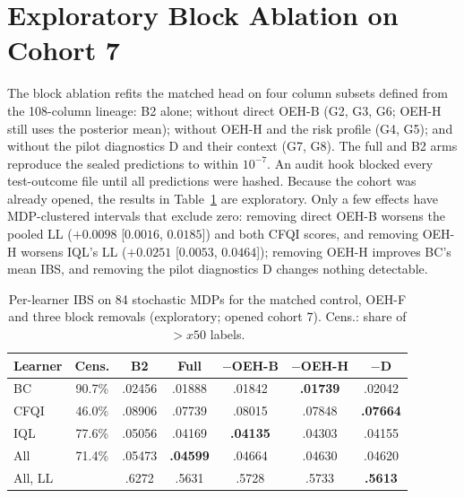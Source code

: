 \section{Exploratory Block Ablation on Cohort 7}
\label{supp:ablation}
The block ablation refits the matched head on four column subsets defined from the 108-column lineage: B2 alone; without direct OEH-B (G2, G3, G6; OEH-H still uses the posterior mean); without OEH-H and the risk profile (G4, G5); and without the pilot diagnostics D and their context (G7, G8). The full and B2 arms reproduce the sealed predictions to within $10^{-7}$. An audit hook blocked every test-outcome file until all predictions were hashed. Because the cohort was already opened, the results in Table~\ref{tab:learner} are exploratory. Only a few effects have MDP-clustered intervals that exclude zero: removing direct OEH-B worsens the pooled LL ($+0.0098$ [$0.0016$, $0.0185$]) and both CFQI scores, and removing OEH-H worsens IQL's LL ($+0.0251$ [$0.0053$, $0.0464$]); removing OEH-H improves BC's mean IBS, and removing the pilot diagnostics D changes nothing detectable.

\begin{table}[t]
\centering
\caption{Per-learner IBS on 84 stochastic MDPs for the matched control, OEH-F and three block removals (exploratory; opened cohort 7). Cens.: share of $>x50$ labels.}
\label{tab:learner}
\footnotesize
\setlength{\tabcolsep}{2.6pt}
\begin{tabular}{@{}lcccccc@{}}
\toprule
Learner & Cens. & B2 & Full & $-$OEH-B & $-$OEH-H & $-$D\\
\midrule
BC & 90.7\% & .02456 & .01888 & .01842 & \textbf{.01739} & .02042\\
CFQI & 46.0\% & .08906 & .07739 & .08015 & .07848 & \textbf{.07664}\\
IQL & 77.6\% & .05056 & .04169 & \textbf{.04135} & .04303 & .04155\\
All & 71.4\% & .05473 & \textbf{.04599} & .04664 & .04630 & .04620\\
\midrule
All, LL & & .6272 & .5631 & .5728 & .5733 & \textbf{.5613}\\
\bottomrule
\end{tabular}
\end{table}

